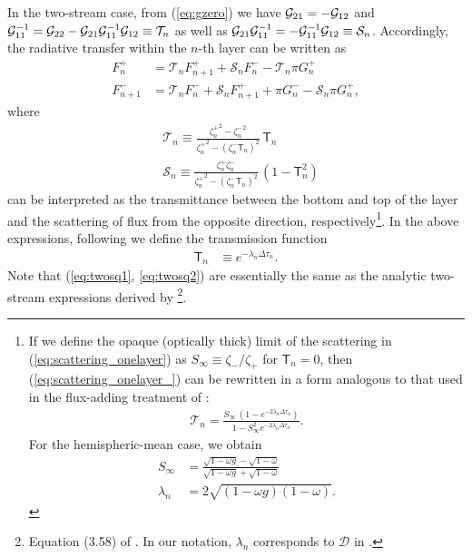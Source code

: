 In the two-stream case, from (\ref{eq:gzero}) we have $\mathcal{G}_{21} = -\mathcal{G}_{12}$ and $\mathcal{G}_{11}^{-1} = \mathcal{G}_{22} - \mathcal{G}_{21} \mathcal{G}_{11}^{-1} \mathcal{G}_{12} \equiv \mathcal{T}_n$ as well as $\mathcal{G}_{21} \mathcal{G}_{11}^{-1} = - \mathcal{G}_{11}^{-1} \mathcal{G}_{12} \equiv \mathcal{S}_n$. Accordingly, the radiative transfer within the $n$-th layer can be written as
\begin{align}
\label{eq:twosq1}
 F^+_n &= \mathcal{T}_n F^+_{n+1} + \mathcal{S}_n F^-_n - \mathcal{T}_n \pi G_n^+ \\
 \label{eq:twosq2}
 F^-_{n+1} &= \mathcal{T}_n F^-_{n} + \mathcal{S}_n F^+_{n+1} + \pi G_n^- - \mathcal{S}_n \pi G_n^+,
\end{align}
where
\begin{align}
\label{eq:transmission_onelayer}
 &\mathcal{T}_n \equiv 
 \frac{{{\zeta^+_n}}^2 -{{\zeta^-_n}}^2 }{{\zeta^+_n}^2  - (\zeta^-_n\mathsf{T}_n)^2 } \,\mathsf{T}_n \\
 \label{eq:scattering_onelayer}
&\mathcal{S}_n  \equiv 
\frac{\zeta^+_n \zeta^-_n }{{\zeta^+_n}^2  - (\zeta^-_n\mathsf{T}_n)^2 } \,(1-\mathsf{T}_n^2)
 \end{align}
can be interpreted as the transmittance between the bottom and top of the layer and the scattering of flux from the opposite direction, respectively\footnote{If we define the opaque (optically thick) limit of the scattering in (\ref{eq:scattering_onelayer}) as $S_\infty \equiv \zeta_-/\zeta_+$ for $\mathsf{T}_n=0$, then (\ref{eq:scattering_onelayer_}) can be rewritten in a form analogous to that used in the flux-adding treatment of \cite{2023PSJ.....4...10R}:
\begin{align}
\label{eq:scattering_onelayer_}
 \mathcal{T}_n = \frac{S_\infty \, ( 1 - e^{-2 \lambda_n \Delta \tau_n})}{1 - S_\infty^2  e^{-2 \lambda_n \Delta \tau_n} } .
 \end{align}
 For the hemispheric-mean case, we obtain
 \begin{align}
     S_\infty &= \frac{\sqrt{1-\omega g}-\sqrt{1-\omega}}{\sqrt{1-\omega g}+\sqrt{1-\omega}} \\
     \lambda_n &= 2 \sqrt{(1-\omega g)(1-\omega)}.
 \end{align}
 }. In the above expressions, following \cite{heng2017exoplanetary} we define the transmission function
 \begin{align}
 \label{eq:opacity_transfer}
 \mathsf{T}_n &\equiv e^{-\lambda_n \Delta \tau_n}.
\end{align} 
Note that (\ref{eq:twosq1}, \ref{eq:twosq2}) are essentially the same as the analytic two-stream expressions derived by \cite{heng2017exoplanetary}\footnote{Equation (3.58) of \cite{heng2017exoplanetary}. In our notation, $\lambda_n$ corresponds to $\mathcal{D}$ in \cite{heng2017exoplanetary}.}.

